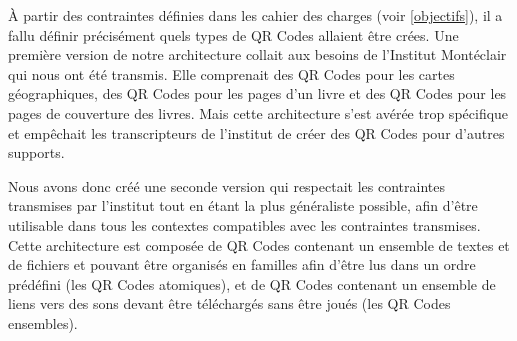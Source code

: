 \par
À partir des contraintes définies dans les cahier des charges (voir \ref{objectifs}), il a fallu définir précisément quels types de QR Codes allaient être crées. Une première version de notre architecture collait aux besoins de l'Institut Montéclair qui nous ont été transmis. Elle comprenait des QR Codes pour les cartes géographiques, des QR Codes pour les pages d'un livre et des QR Codes pour les pages de couverture des livres. Mais cette architecture s'est avérée trop spécifique et empêchait les transcripteurs de l'institut de créer des QR Codes pour d'autres supports.\\

\par
Nous avons donc créé une seconde version qui respectait les contraintes transmises par l'institut tout en étant la plus généraliste possible, afin d'être utilisable dans tous les contextes compatibles avec les contraintes transmises. Cette architecture est composée de QR Codes contenant un ensemble de textes et de fichiers et pouvant être organisés en familles afin d'être lus dans un ordre prédéfini (les QR Codes atomiques), et de QR Codes contenant un ensemble de liens vers des sons devant être téléchargés sans être joués (les QR Codes ensembles).
